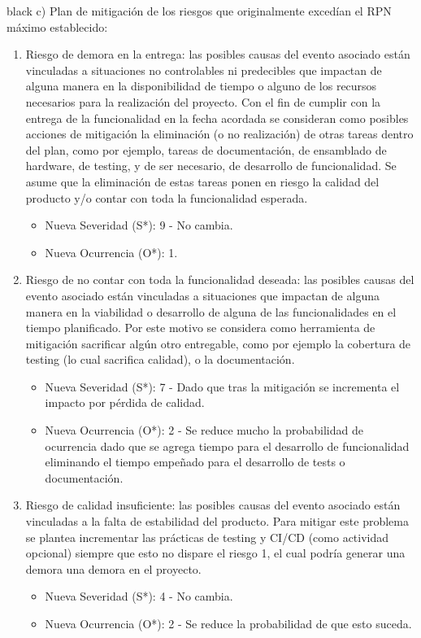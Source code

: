 \documentclass[
11pt, %
]{charter}
\begin{document}
\begin{consigna}{black}
c) Plan de mitigación de los riesgos que originalmente excedían el RPN máximo establecido:
\begin{enumerate}
	\item Riesgo de demora en la entrega: las posibles causas del evento asociado están vinculadas a situaciones no controlables ni predecibles que impactan de alguna manera en la disponibilidad de tiempo o alguno de los recursos necesarios para la realización del proyecto. Con el fin de cumplir con la entrega de la funcionalidad en la fecha acordada se consideran como posibles acciones de mitigación la eliminación (o no realización) de otras tareas dentro del plan, como por ejemplo, tareas de documentación, de ensamblado de hardware, de testing, y de ser necesario, de desarrollo de funcionalidad. Se asume que la eliminación de estas tareas ponen en riesgo la calidad del producto y/o contar con toda la funcionalidad esperada.
	\begin{itemize}
		\item Nueva Severidad (S*): 9 - No cambia.
		\item Nueva Ocurrencia (O*): 1.
	\end{itemize}
	
	\item Riesgo de no contar con toda la funcionalidad deseada: las posibles causas del evento asociado están vinculadas a situaciones que impactan de alguna manera en la viabilidad o desarrollo de alguna de las funcionalidades en el tiempo planificado. Por este motivo se considera como herramienta de mitigación sacrificar algún otro entregable, como por ejemplo la cobertura de testing (lo cual sacrifica calidad), o la documentación.
	\begin{itemize}
		\item Nueva Severidad (S*): 7 - Dado que tras la mitigación se incrementa el impacto por pérdida de calidad.
		\item Nueva Ocurrencia (O*): 2 - Se reduce mucho la probabilidad de ocurrencia dado que se agrega tiempo para el desarrollo de funcionalidad eliminando el tiempo empeñado para el desarrollo de tests o documentación.
	\end{itemize}
	
	
	\item Riesgo de calidad insuficiente: las posibles causas del evento asociado están vinculadas a la falta de estabilidad del producto. Para mitigar este problema se plantea incrementar las prácticas de testing y CI/CD (como actividad opcional) siempre que esto no dispare el riesgo 1, el cual podría generar una demora una demora en el proyecto.
	\begin{itemize}
		\item Nueva Severidad (S*): 4 - No cambia.
		\item Nueva Ocurrencia (O*): 2 - Se reduce la probabilidad de que esto suceda.
	\end{itemize}	
	

\end{enumerate}
\end{consigna}
\end{document}

